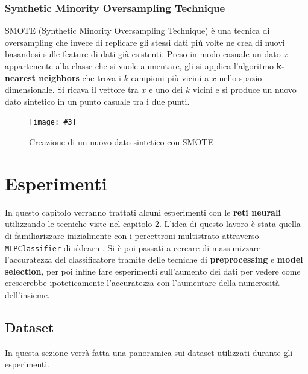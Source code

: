 \documentclass[12pt, twoside, letterpaper]{report}
\newcommand{\img}[4] {
	\begin{figure}
		\centering
		\texttt{[image: \#3]}\\
		\caption{#1}
		\label{#4}
	\end{figure}
}
\begin{document}
			\subsection{Synthetic Minority Oversampling Technique}
				SMOTE (Synthetic Minority Oversampling Technique) è una tecnica di oversampling che invece di replicare gli stessi dati più volte ne crea di nuovi basandosi sulle feature di dati già esistenti. Preso in modo casuale un dato $x$ appartenente alla classe che si vuole aumentare, gli si applica l'algoritmo \textbf{k-nearest neighbors} che trova i $k$ campioni più vicini a $x$ nello spazio dimensionale. Si ricava il vettore tra $x$ e uno dei $k$ vicini e si produce un nuovo dato sintetico in un punto casuale tra i due punti. \cite{smote}
				\img{Creazione di un nuovo dato sintetico con SMOTE}{0.3}{smote.png}{smote}
				
				
	\chapter{Esperimenti} \label{chap:esperimenti}
		In questo capitolo verranno trattati alcuni esperimenti con le \textbf{reti neurali} utilizzando le tecniche viste nel capitolo 2. L'idea di questo lavoro è stata quella di familiarizzare inizialmente con i percettroni multistrato attraverso \texttt{MLPClassifier} di sklearn \cite{sklearn}. Si è poi passati a cercare di massimizzare l'accuratezza del classificatore tramite delle tecniche di \textbf{preprocessing} e \textbf{model selection}, per poi infine fare esperimenti sull'aumento dei dati per vedere come crescerebbe ipoteticamente l'accuratezza con l'aumentare della numerosità dell'insieme.
	
	\section{Dataset} 
		In questa sezione verrà fatta una panoramica sui dataset utilizzati durante gli esperimenti.
\end{document}
